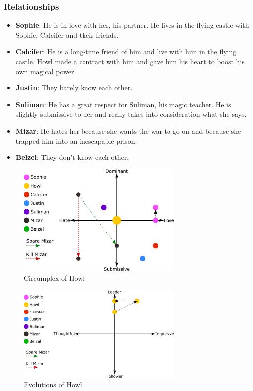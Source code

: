 \subsubsection*{Relationships}
\begin{itemize}
\item \textbf{Sophie}: He is in love with her, his partner. He lives in the flying castle with Sophie, Calcifer and their friends.
\item \textbf{Calcifer}: He is a long-time friend of him and live with him in the flying castle. Howl made a contract with him and gave him his heart to boost his own magical power.
\item \textbf{Justin}: They barely know each other.
\item \textbf{Suliman}: He has a great respect for Suliman, his magic teacher. He is slightly submissive to her and really takes into consideration what she says.
\item \textbf{Mizar}: He hates her because she wants the war to go on and because she trapped him into an inescapable prison.
\item \textbf{Belzel}: They don't know each other.
\end{itemize}

\begin{figure}[H]
  \centering
  \includegraphics[width=8cm]{Images/Diagrams/Circumplexes/howlCircumplex}
  \caption{Circumplex of Howl}
\end{figure}

\begin{figure}[H]
  \centering
  \includegraphics[width=8cm]{Images/Diagrams/Evolutions/howlEvolution}
  \caption{Evolutions of Howl}
\end{figure}


